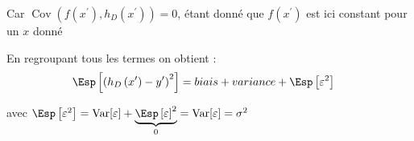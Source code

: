 \begin{reponse}
	Car $\operatorname{Cov}\left(f\left(x^{\prime}\right), h_D\left({x^{\prime}}\right)\right)=0$, étant donné que $f\left(x^{\prime}\right)$ est ici constant pour un $x$ donné

	En regroupant tous les termes on obtient :
	\begin{align*}
		\Esp\left[\left(h_D\left({x^{\prime}}\right) - y^{\prime}\right)^2\right]
		 & = biais + variance + \Esp\left[\varepsilon^2\right]
	\end{align*}

	avec $\Esp\left[\varepsilon^{2}\right]
		= \operatorname{Var}[\varepsilon]+\underbrace{\Esp\left[\varepsilon\right]^{2}}_{0} = \operatorname{Var}[\varepsilon] = \sigma^2$
\end{reponse}
